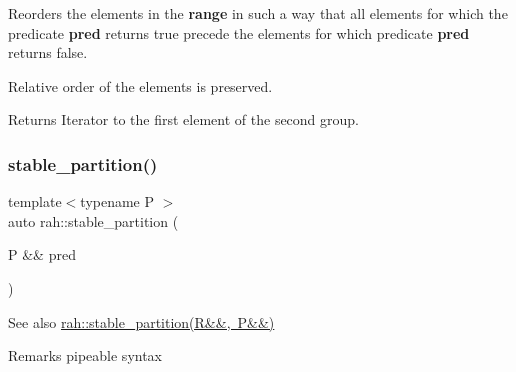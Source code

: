 Reorders the elements in the {\bfseries{range}} in such a way that all elements for which the predicate {\bfseries{pred}} returns {\ttfamily true} precede the elements for which predicate {\bfseries{pred}} returns false. 

Relative order of the elements is preserved. \begin{DoxyReturn}{Returns}
Iterator to the first element of the second group.
\end{DoxyReturn}

\begin{DoxyCodeInclude}{0}
\end{DoxyCodeInclude}
\mbox{\label{namespacerah_ae51c8e542493089f60675db2d0018329}} 
\subsubsection{\texorpdfstring{stable\_partition()}{stable\_partition()}\hspace{0.1cm}{\footnotesize\ttfamily [2/2]}}
{\footnotesize\ttfamily template$<$typename P $>$ \\
auto rah\+::stable\+\_\+partition (\begin{DoxyParamCaption}\item[{P \&\&}]{pred }\end{DoxyParamCaption})}

\begin{DoxySeeAlso}{See also}
\mbox{\hyperlink{namespacerah_ac184b21a98515705f9b4845875fb689b}{rah\+::stable\+\_\+partition(\+R\&\&, P\&\&)}} 
\end{DoxySeeAlso}
\begin{DoxyRemark}{Remarks}
pipeable syntax
\end{DoxyRemark}

